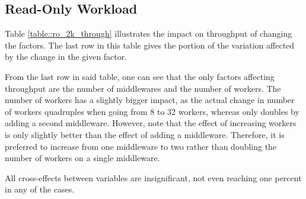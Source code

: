 \documentclass[11pt,a4paper]{article}
\begin{document}
\subsection{Read-Only Workload}
Table \ref{table::ro_2k_through} illustrates the impact on throughput of changing the factors. The last row in this table gives the portion of the variation affected by the change in the given factor.

From the last row in said table, one can see that the only factors affecting throughput are the number of middlewares and the number of workers. The number of workers has a slightly bigger impact, as the actual change in number of workers quadruples when going from 8 to 32 workers, whereas only doubles by adding a second middleware. However, note that the effect of increasing workers is only slightly better than the effect of adding a middleware. Therefore, it is preferred to increase from one middleware to two rather than doubling the number of workers on a single middleware.

All cross-effects between variables are insignificant, not even reaching one percent in any of the cases.
\end{document}
